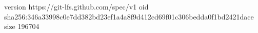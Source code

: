 version https://git-lfs.github.com/spec/v1
oid sha256:346a33998c0e7dd382bd23ef1a4a8f9d412cd69f01c306bedda0f1bd2421dace
size 196704
